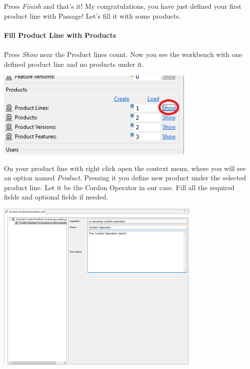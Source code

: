 \documentclass[12pt]{report}
\begin{document}
Press \textit{Finish} and that's it! My congratulations, you have just defined your first product line with Passage! Let's fill it with some products.

\paragraph*{Fill Product Line with Products}
\paragraph*{}

Press \textit{Show} near the Product lines count. Now you see the workbench with one defined product line and no products under it.

\begin{center}
    \includegraphics[width=0.75\textwidth]{product_create}
\end{center}

On your product line with right click open the context menu, where you will see an option named \textit{Product}. Pressing it you define new product under the selected product line.
Let it be the Cordon Operator in our case. Fill all the required fields and optional fields if needed.

\begin{center}
    \includegraphics[width=0.75\textwidth]{product_dialog}
\end{center}
\end{document}
